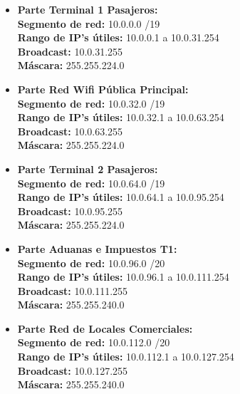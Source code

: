 \begin{itemize}[leftmargin=*]
    \item \textbf{Parte Terminal 1 Pasajeros:} \\
    \textbf{Segmento de red:} 10.0.0.0 /19 \\
    \textbf{Rango de IP's útiles:} 10.0.0.1 a 10.0.31.254 \\
    \textbf{Broadcast:} 10.0.31.255 \\
    \textbf{Máscara:} 255.255.224.0 
    \vspace{5pt}

    \item \textbf{Parte Red Wifi Pública Principal:} \\
    \textbf{Segmento de red:} 10.0.32.0 /19 \\
    \textbf{Rango de IP's útiles:} 10.0.32.1 a 10.0.63.254 \\
    \textbf{Broadcast:} 10.0.63.255 \\
    \textbf{Máscara:} 255.255.224.0 
    \vspace{5pt}

    \item \textbf{Parte Terminal 2 Pasajeros:} \\
    \textbf{Segmento de red:} 10.0.64.0 /19 \\
    \textbf{Rango de IP's útiles:} 10.0.64.1 a 10.0.95.254 \\
    \textbf{Broadcast:} 10.0.95.255 \\
    \textbf{Máscara:} 255.255.224.0 
    \vspace{5pt}

    \item \textbf{Parte Aduanas e Impuestos T1:} \\
    \textbf{Segmento de red:} 10.0.96.0 /20 \\
    \textbf{Rango de IP's útiles:} 10.0.96.1 a 10.0.111.254 \\
    \textbf{Broadcast:} 10.0.111.255 \\
    \textbf{Máscara:} 255.255.240.0 
    \vspace{5pt}

    \item \textbf{Parte Red de Locales Comerciales:} \\
    \textbf{Segmento de red:} 10.0.112.0 /20 \\
    \textbf{Rango de IP's útiles:} 10.0.112.1 a 10.0.127.254 \\
    \textbf{Broadcast:} 10.0.127.255 \\
    \textbf{Máscara:} 255.255.240.0 
    \vspace{5pt}


\end{itemize}
